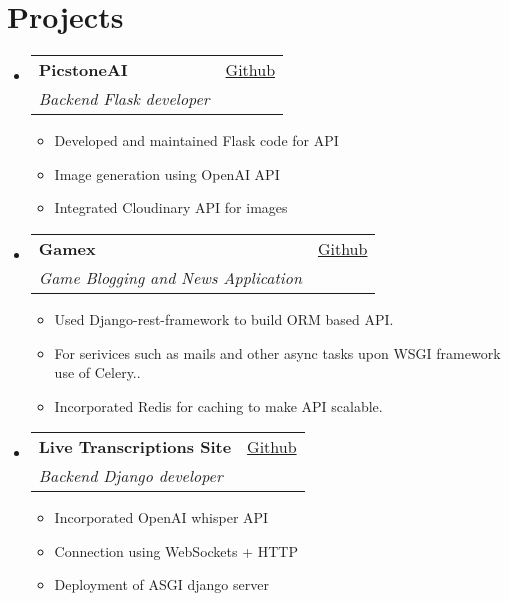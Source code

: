 \documentclass[letterpaper,11pt]{article}
\makeatletter
\newcommand{\resumeItem}[1]{
  \item\small{
    {#1 \vspace{-2pt}}
  }
}
\newcommand{\resumeSubheading}[4]{
  \vspace{-2pt}\item
    \begin{tabular*}{0.97\textwidth}[t]{l@{\extracolsep{\fill}}r}
      \textbf{#1} & #2 \\
      \textit{\small#3} & \textit{\small #4} \\
    \end{tabular*}\vspace{-7pt}
}
\newcommand{\resumeProjectHeading}[2]{
    \item
    \begin{tabular*}{0.97\textwidth}{l@{\extracolsep{\fill}}r}
      \small#1 & #2 \\
    \end{tabular*}\vspace{-7pt}
}
\newcommand{\resumeSubHeadingListStart}{\begin{itemize}[leftmargin=0.15in, label={}]}
\newcommand{\resumeSubHeadingListEnd}{\end{itemize}}
\newcommand{\resumeItemListStart}{\begin{itemize}}
\newcommand{\resumeItemListEnd}{\end{itemize}\vspace{-5pt}}
\makeatother
\begin{document}
\section{Projects}
  \resumeSubHeadingListStart

    \resumeSubheading
      {PicstoneAI}{\href{https://github.com/devprashantt/picstone-generative-ai}{Github}}
      {Backend Flask developer}{}
      \resumeItemListStart
      \resumeItem{Developed and maintained Flask code for API}
      \resumeItem{Image generation using OpenAI API}
      \resumeItem{Integrated Cloudinary API for images}
    \resumeItemListEnd

    \resumeSubheading
      {Gamex}{\href{https://github.com/kyroyen/gamex}{Github}}
      {Game Blogging and News Application}{}
      \resumeItemListStart
        \resumeItem{Used Django-rest-framework to build ORM based API.}
        \resumeItem{For serivices such as mails and other async tasks upon WSGI framework
use of Celery..}
        \resumeItem{Incorporated Redis for caching to make API scalable.}
      \resumeItemListEnd

      \resumeSubheading
      {Live Transcriptions Site}{\href{https://github.com/Kyroyen/liveTranscriptionWhisperAPI-}{Github}}
      {Backend Django developer}{}
      \resumeItemListStart
      \resumeItem{Incorporated OpenAI whisper API}
      \resumeItem{Connection using WebSockets + HTTP}
      \resumeItem{Deployment of ASGI django server}
    \resumeItemListEnd

  \resumeSubHeadingListEnd


\end{document}

